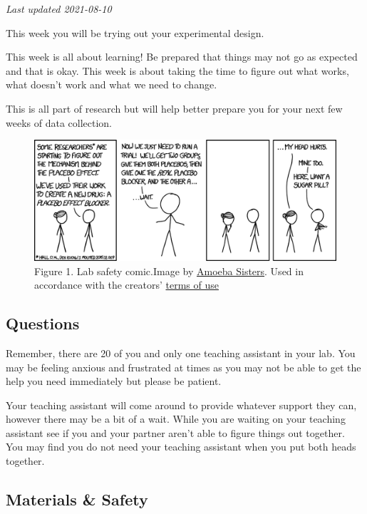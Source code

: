 \documentclass[
]{book}
\begin{document}
\emph{Last updated 2021-08-10}

This week you will be trying out your experimental design.

This week is all about learning! Be prepared that things may not go as expected and that is okay. This week is about taking the time to figure out what works, what doesn't work and what we need to change.

This is all part of research but will help better prepare you for your next few weeks of data collection.

\begin{figure}
\centering
\includegraphics{figures_images/Lab4-Fig1.png}
\caption{Figure 1. Lab safety comic.Image by \href{Lab4-Fig1.png}{Amoeba Sisters}. Used in accordance with the creators' \href{https://www.amoebasisters.com/termsofuse.html}{terms of use}}
\end{figure}

\hypertarget{questions}{%
\subsection*{Questions}\label{questions}}

Remember, there are 20 of you and only one teaching assistant in your lab. You may be feeling anxious and frustrated at times as you may not be able to get the help you need immediately but please be patient.

Your teaching assistant will come around to provide whatever support they can, however there may be a bit of a wait. While you are waiting on your teaching assistant see if you and your partner aren't able to figure things out together. You may find you do not need your teaching assistant when you put both heads together.

\hypertarget{materials-safety}{%
\subsection*{Materials \& Safety}\label{materials-safety}}
\end{document}
